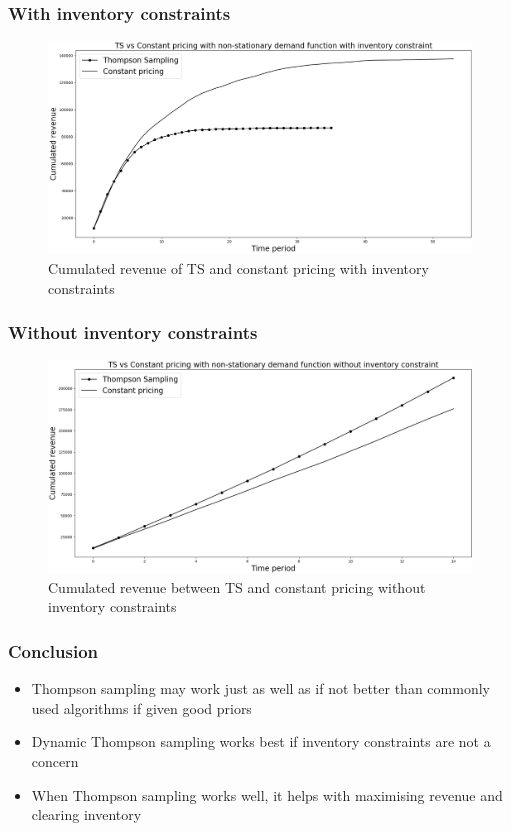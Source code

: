 \documentclass[11pt]{beamer}
\begin{document}
\begin{frame}
\frametitle{With inventory constraints}
\begin{figure}[h]
\centering
\includegraphics[width=1\textwidth]{4.png}
\caption{\label{fig:five}Cumulated revenue of TS and constant pricing with inventory constraints}
\end{figure}
\end{frame}

\begin{frame}
\frametitle{Without inventory constraints}
\begin{figure}[h]
\centering
\includegraphics[width=1\textwidth]{2.png}
\caption{\label{fig:four}Cumulated revenue between TS and constant pricing without inventory constraints}
\end{figure}
\end{frame}

\begin{frame}
\frametitle{Conclusion}
\begin{itemize}
	\item Thompson sampling may work just as well as if not better than commonly used algorithms if given good priors
	\item Dynamic Thompson sampling works best if inventory constraints are not a concern
	\item When Thompson sampling works well, it helps with maximising revenue and clearing inventory
\end{itemize}
\end{frame}
\end{document}
